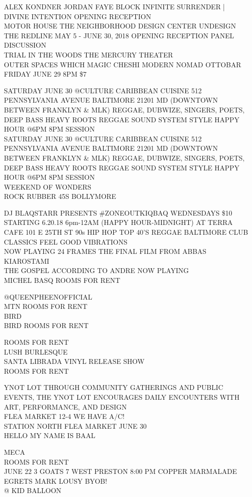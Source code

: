 \documentclass[10pt,letterpaper]{article}
\begin{document}
ALEX KONDNER JORDAN FAYE BLOCK INFINITE SURRENDER | DIVINE INTENTION OPENING RECEPTION\\
MOTOR HOUSE THE NEIGHBORHOOD DESIGN CENTER UNDESIGN THE REDLINE MAY 5 {-} JUNE 30, 2018 OPENING RECEPTION PANEL DISCUSSION\\
TRIAL IN THE WOODS THE MERCURY THEATER\\
OUTER SPACES WHICH MAGIC CHESHI MODERN NOMAD OTTOBAR FRIDAY JUNE 29 8PM \$7

SATURDAY JUNE 30 @CULTURE CARIBBEAN CUISINE 512 PENNSYLVANIA AVENUE BALTIMORE 21201 MD (DOWNTOWN BETWEEN FRANKLYN \& MLK) REGGAE, DUBWIZE, SINGERS, POETS, DEEP BASS HEAVY ROOTS REGGAE SOUND SYSTEM STYLE HAPPY HOUR @6PM 8PM SESSION\\
SATURDAY JUNE 30 @CULTURE CARIBBEAN CUISINE 512 PENNSYLVANIA AVENUE BALTIMORE 21201 MD (DOWNTOWN BETWEEN FRANKLYN \& MLK) REGGAE, DUBWIZE, SINGERS, POETS, DEEP BASS HEAVY ROOTS REGGAE SOUND SYSTEM STYLE HAPPY HOUR @6PM 8PM SESSION\\
WEEKEND OF WONDERS\\
ROCK RUBBER 45S BOLLYMORE

DJ BLAQSTARR PRESENTS \#ZONEOUTKIQBAQ WEDNESDAYS \$10 STARTING 6.20.18 6pm{-}12AM (HAPPY HOUR{-}MIDNIGHT) AT TERRA CAFE 101 E 25TH ST 90s HIP HOP TOP 40'S REGGAE BALTIMORE CLUB CLASSICS FEEL GOOD VIBRATIONS\\
NOW PLAYING 24 FRAMES THE FINAL FILM FROM ABBAS KIAROSTAMI\\
THE GOSPEL ACCORDING TO ANDRE NOW PLAYING\\
MICHEL BASQ ROOMS FOR RENT

@QUEENPHEENOFFICIAL\\
MTN ROOMS FOR RENT\\
BIRD\\
BIRD ROOMS FOR RENT

ROOMS FOR RENT\\
LUSH BURLESQUE\\
SANTA LIBRADA VINYL RELEASE SHOW\\
ROOMS FOR RENT

YNOT LOT THROUGH COMMUNITY GATHERINGS AND PUBLIC EVENTS, THE YNOT LOT ENCOURAGES DAILY ENCOUNTERS WITH ART, PERFORMANCE, AND DESIGN\\
FLEA MARKET 12{-}4 WE HAVE A/C!\\
STATION NORTH FLEA MARKET JUNE 30\\
HELLO MY NAME IS BAAL

MECA\\
ROOMS FOR RENT\\
JUNE 22 3 GOATS 7 WEST PRESTON 8:00 PM COPPER MARMALADE EGRETS MARK LOUSY BYOB!\\
@ KID BALLOON
\end{document}

